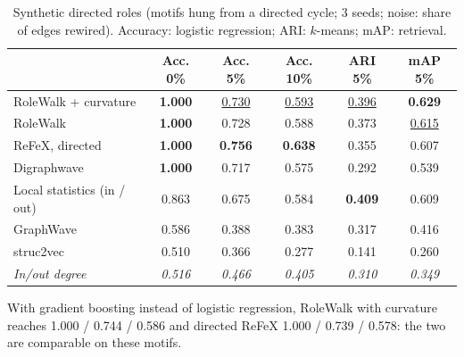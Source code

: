 \documentclass[10pt]{article}
\theoremstyle{definition}
\newcommand{\best}[1]{\textbf{#1}}
\newcommand{\second}[1]{\underline{#1}}
\begin{document}
\begin{table}[!ht]
\centering
\caption{Synthetic directed roles (motifs hung from a directed cycle; 3 seeds; noise: share of edges rewired). Accuracy: logistic regression; ARI: $k$-means; mAP: retrieval.}
\small
\begin{tabular}{lccccc}
\toprule
& Acc. 0\% & Acc. 5\% & Acc. 10\% & ARI 5\% & mAP 5\% \\
\midrule
RoleWalk + curvature & \best{1.000} & \second{0.730} & \second{0.593} & \second{0.396} & \best{0.629} \\
RoleWalk & \best{1.000} & 0.728 & 0.588 & 0.373 & \second{0.615} \\
ReFeX, directed & \best{1.000} & \best{0.756} & \best{0.638} & 0.355 & 0.607 \\
Digraphwave & \best{1.000} & 0.717 & 0.575 & 0.292 & 0.539 \\
Local statistics (in / out) & 0.863 & 0.675 & 0.584 & \best{0.409} & 0.609 \\
GraphWave & 0.586 & 0.388 & 0.383 & 0.317 & 0.416 \\
struc2vec & 0.510 & 0.366 & 0.277 & 0.141 & 0.260 \\
\midrule
\emph{In/out degree} & \emph{0.516} & \emph{0.466} & \emph{0.405} & \emph{0.310} & \emph{0.349} \\
\bottomrule
\end{tabular}
\end{table}
With gradient boosting instead of logistic regression, RoleWalk with curvature reaches 1.000 / 0.744 / 0.586 and directed ReFeX 1.000 / 0.739 / 0.578: the two are comparable on these motifs.
\end{document}
